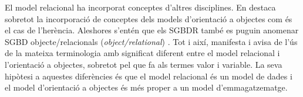 El model relacional ha incorporat conceptes d'altres disciplines. En
destaca sobretot la incorporació de conceptes dels models d'orientació
a objectes com és el cas de l'herència.  Aleshores s'entén que els
SGBDR també es puguin anomenar SGBD objecte/relacionals
(\emph{object/relational})
\parencite{date02:foundation}.  Tot i així, \textcite[cap.~6]{date06}
manifesta i avisa de l'ús de la mateixa terminologia amb significat
diferent entre el model relacional i l'orientació a objectes, sobretot
pel que fa als termes valor i variable. %
La seva hipòtesi a aquestes diferències és que el model relacional és
un model de dades i el model d'orientació a objectes és més proper a
un model
d'emmagatzematge. %






